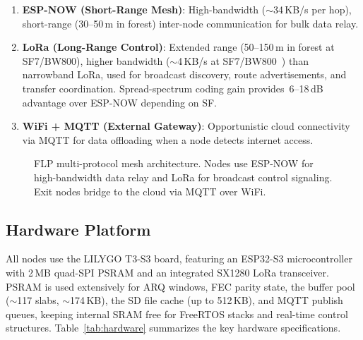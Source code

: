 \documentclass[conference]{IEEEtran}
\begin{document}
\begin{enumerate}
  \item \textbf{ESP-NOW (Short-Range Mesh)}: High-bandwidth (\(\sim\)34\,KB/s per hop), short-range (30--50\,m in forest) inter-node communication for bulk data relay.
  \item \textbf{LoRa (Long-Range Control)}: Extended range (50--150\,m in forest at SF7/BW800), higher bandwidth (\(\sim\)4\,KB/s at SF7/BW800~\cite{semtech2020sx1280}) than narrowband LoRa, used for broadcast discovery, route advertisements, and transfer coordination. Spread-spectrum coding gain provides~6--18\,dB advantage over ESP-NOW depending on SF.
  \item \textbf{WiFi + MQTT (External Gateway)}: Opportunistic cloud connectivity via MQTT for data offloading when a node detects internet access.
\end{enumerate}

\begin{figure}[htbp]
  \centering
  \caption{FLP multi-protocol mesh architecture. Nodes use ESP-NOW for high-bandwidth data relay and LoRa for broadcast control signaling. Exit nodes bridge to the cloud via MQTT over WiFi.}
  \label{fig:architecture}
\end{figure}

\subsection{Hardware Platform}

All nodes use the LILYGO T3-S3 board, featuring an ESP32-S3 microcontroller with 2\,MB quad-SPI PSRAM and an integrated SX1280 LoRa transceiver. PSRAM is used extensively for ARQ windows, FEC parity state, the buffer pool (\(\sim\)117 slabs, \(\sim\)174\,KB), the SD file cache (up to 512\,KB), and MQTT publish queues, keeping internal SRAM free for FreeRTOS stacks and real-time control structures. Table~\ref{tab:hardware} summarizes the key hardware specifications.
\end{document}
